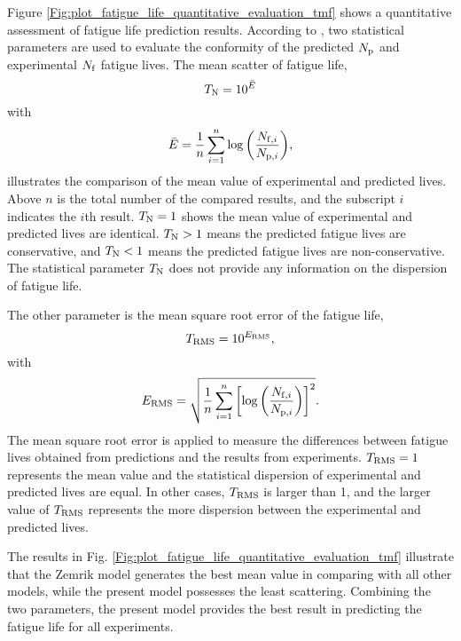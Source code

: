 \documentclass[preprint,5p,twocolumn,11pt,sort&compress]{elsarticle}
\begin{document}
{Figure \ref{Fig:plot_fatigue_life_quantitative_evaluation_tmf} shows a quantitative assessment of fatigue life prediction results. According to \cite{KAROLCZUK201439,WALAT201473,SKIBICKI201718}, two statistical parameters are used to evaluate the conformity of the predicted $N_{\rm p}$ and experimental $N_{\rm f}$ fatigue lives. The mean scatter of fatigue life,}
\begin{equation}
{T_{\rm N}} = {10^{\bar E}}
\end{equation}
with
\begin{equation}
\bar E = \frac{1}{n}\sum\limits_{i = 1}^n {\log \left( {\frac{{{N_{{\rm f},i}}}}{{{N_{{\rm p},i}}}}} \right)},
\end{equation}
{illustrates the comparison of the mean value of experimental and predicted lives. Above $n$ is the total number of the compared results, and the subscript $i$ indicates the $i$th result. $T_{\rm N} = 1$ shows the mean value of experimental and predicted lives are identical. $T_{\rm N} > 1$ means the predicted fatigue lives are conservative, and $T_{\rm N} < 1$ means the predicted fatigue lives are non-conservative. The statistical parameter $T_{\rm N}$ does not provide any information on the dispersion of fatigue life.}

The other parameter is the  mean square root error of the fatigue life,
\begin{equation}
{T_{\rm RMS}} = {10^{{E_{\rm RMS}}}},
\end{equation}
with
\begin{equation}
{E_{\rm RMS}} = \sqrt {\frac{1}{n}\sum\limits_{i = 1}^n {\left[{{\log }}\left( {\frac{{{N_{{\rm f},i}}}}{{{N_{{\rm p},i}}}}} \right) \right]^2}}.
\end{equation}
{The  mean square root error is applied to measure the differences between fatigue lives obtained from predictions and the results from experiments. $T_{\rm RMS} = 1$ represents the mean value and the statistical dispersion of experimental and predicted lives are equal. In other cases, $T_{\rm RMS}$ is larger than 1, and the larger value of $T_{\rm RMS}$ represents the more dispersion between the experimental and predicted lives.}

The results in Fig. \ref{Fig:plot_fatigue_life_quantitative_evaluation_tmf} illustrate that the Zemrik model generates the best mean value in comparing with all other models, while the present model possesses the least scattering. Combining the two parameters, the present model provides the best result in predicting the fatigue life for all experiments.
\end{document}
